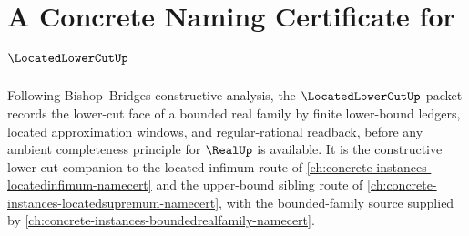 \chapter{A Concrete Naming Certificate for $\LocatedLowerCutUp$}
\label{ch:concrete-instances-located-lower-cut-namecert}

Following Bishop--Bridges constructive analysis, the $\LocatedLowerCutUp$ packet records the lower-cut face of a bounded real family by finite lower-bound ledgers, located approximation windows, and regular-rational readback, before any ambient completeness principle for $\RealUp$ is available. It is the constructive lower-cut companion to the located-infimum route of \autoref{ch:concrete-instances-locatedinfimum-namecert} and the upper-bound sibling route of \autoref{ch:concrete-instances-locatedsupremum-namecert}, with the bounded-family source supplied by \autoref{ch:concrete-instances-boundedrealfamily-namecert}.

